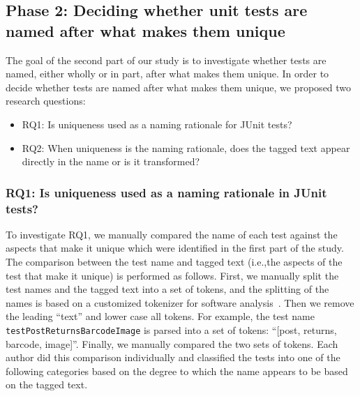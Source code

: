\documentclass[proposal.tex]{subfiles}
\begin{document}
\subsection{Phase 2: Deciding whether unit tests are named after what makes them unique}

The goal of the second part of our study is to investigate whether tests are named, either wholly or in part, after what makes them unique.
%
In order to decide whether tests are named after what makes them unique, we proposed two research questions:
\begin{itemize}
    \item RQ1: Is uniqueness used as a naming rationale for JUnit tests?
    \item RQ2: When uniqueness is the naming rationale, does the tagged text appear directly in the name or is it transformed?
\end{itemize}

\subsubsection{RQ1: Is uniqueness used as a naming rationale in JUnit tests?}

To investigate RQ1, we manually compared the name of each test against the aspects that make it unique which were identified in the first part of the study.
%
The comparison between the test name and tagged text (i.e.,the aspects of the test that make it unique) is performed as follows.
%
First, we manually split the test names and the tagged text into a set of tokens, and the splitting of the names is based on a customized tokenizer for software analysis~\cite{enslen2009mining}.
%
Then we remove the leading \enquote{text} and lower case all tokens. For example, the test name \texttt{testPostReturnsBarcodeImage} is parsed into a set of tokens: \enquote{[post, returns, barcode, image]}.
%
Finally, we manually compared the two sets of tokens. Each author did this comparison individually and classified the tests into one of the following categories based on the degree to which the name appears to be based on the tagged text.
\end{document}
